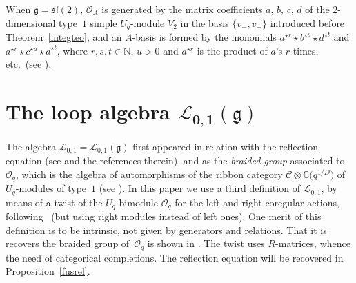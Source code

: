 \documentclass[pdftex]{sigma}%
\numberwithin{equation}{section}
\numberwithin{figure}{section}
\newcommand{\Oq}{\Oo_{q}}
\newcommand{\mc}{\mathbb{C}}
\newcommand{\mn}{\mathbb{N}}
\newcommand{\Ll}{{\mathcal L}}
\newcommand{\Oo}{{\mathcal O}}
\begin{document}
When $\mathfrak{g}={\mathfrak{sl}}(2)$, $\Oo_A$ is generated by the matrix coefficients $a$, $b$, $c$, $d$ of the $2$-dimensional type~$1$ simple $U_q$-module $V_2$ in the basis $\{v_-,v_+\}$ introduced before Theorem~\ref{integteo}, and an $A$-basis is formed by the monomials $a^{\star r}\star b^{\star s} \star d^{\star t}$ and $a^{\star r}\star c^{\star u} \star d^{\star t}$, where $r,s,t\in \mn$, $u>0$ and $a^{\star r}$ is the product of $a$'s $r$ times, etc.\ (see \cite[Lemma~1.3]{DC-L}).

\section[The loop algebra L\_\{0,1\}(g)]{The loop algebra $\boldsymbol{\Ll_{0,1}(\mathfrak g)}$}%

 The algebra $\Ll_{0,1} = \Ll_{0,1}(\mathfrak g)$ first appeared in relation with the reflection equation (see \cite{KS} and the references therein), and as the {\it braided group} associated to $\Oq$, which is the algebra of automorphisms of the ribbon category $\mathcal{C}\otimes \mc\big(q^{1/D}\big)$ of $U_q$-modules of type~$1$ (see \cite[Examples~7.4.1 and~9.4.10]{Majid}). In this paper we use a third definition of $\Ll_{0,1}$, by means of a twist of the $U_q$-bimodule $\Oq$ for the left and right coregular actions, following~\cite{DM} (but using right modules instead of left ones). One merit of this definition is to be intrinsic, not given by generators and relations. That it is recovers the braided group of~$\Oq$ is shown in \cite[Section~5.2]{DKM}. The twist uses $R$-matrices, whence the need of categorical completions. The reflection equation will be recovered in Proposition~\ref{fusrel}.
\end{document}
